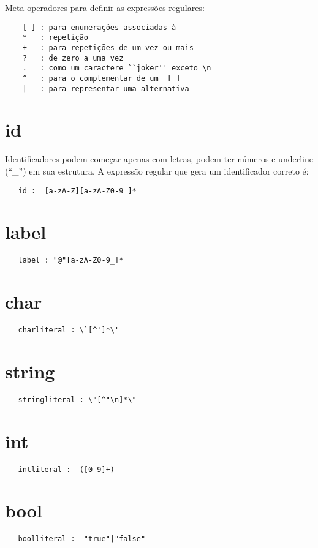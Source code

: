 Meta-operadores para definir as expressões regulares:
\begin{verbatim}
    [ ] : para enumerações associadas à -
    *   : repetição
    +   : para repetições de um vez ou mais
    ?   : de zero a uma vez
    .   : como um caractere ``joker'' exceto \n
    ^   : para o complementar de um  [ ]
    |   : para representar uma alternativa
\end{verbatim}

\section{id}
Identificadores podem começar apenas com letras, podem ter números e underline (``\_'') em sua estrutura.
A expressão regular que gera um identificador correto é:
 \begin{verbatim}
   id :  [a-zA-Z][a-zA-Z0-9_]*
\end{verbatim}

\section{label}
 \begin{verbatim}
   label : "@"[a-zA-Z0-9_]*
\end{verbatim}

\section{char}
\begin{verbatim}
   charliteral : \`[^']*\'
\end{verbatim}

\section{string}
\begin{verbatim}
   stringliteral : \"[^"\n]*\"
\end{verbatim}

\section{int}
\begin{verbatim}
   intliteral :  ([0-9]+)
\end{verbatim}

\section{bool}
\begin{verbatim}
   boolliteral :  "true"|"false"
\end{verbatim}

